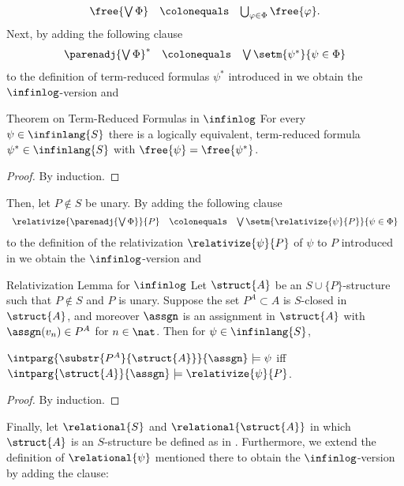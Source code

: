 \begin{enumerate}[1.]
\[
\begin{array}{lll}
\free{\bigvee\Phi} & \colonequals & \bigcup_{\varphi \in \Phi} \free{\varphi}.
\end{array}
\]
Next, by adding the following clause
\[
\begin{array}{lll}
\parenadj{\bigvee \Phi}^\ast & \colonequals & \bigvee \setm{\psi^\ast}{\psi \in \Phi}
\end{array}
\]
to the definition of term-reduced formulas $\psi^\ast$ introduced in  we obtain the $\infinlog$-version and\medskip\\
\begin{theorem}{Theorem on Term-Reduced Formulas in $\infinlog$}
For every $\psi \in \infinlang{S}$ there is a logically equivalent, term-reduced formula $\psi^\ast \in \infinlang{S}$ with $\free{\psi} = \free{\psi^\ast}$.
\end{theorem}
\begin{proof}
By induction.
\end{proof}
Then, let $P \not\in S$ be unary. By adding the following clause
\[
\begin{array}{lll}
\relativize{\parenadj{\bigvee\Phi}}{P} & \colonequals & \bigvee\setm{\relativize{\psi}{P}}{\psi \in \Phi}
\end{array}
\]
to the definition of the relativization $\relativize{\psi}{P}$ of $\psi$ to $P$ introduced in  we obtain the $\infinlog$-version and\medskip\\
\begin{theorem}{Relativization Lemma for $\infinlog$}
Let $\struct{A}$ be an $S \cup \{ P \}$-structure such that $P \not\in S$ and $P$ is unary. Suppose the set $P^A \subset A$ is $S$-closed in $\struct{A}$, and moreover $\assgn$ is an assignment in $\struct{A}$ with $\assgn(v_n) \in P^A$ for $n \in \nat$. Then for $\psi \in \infinlang{S}$,\\
\centerline{$\intparg{\substr{P^A}{\struct{A}}}{\assgn} \models \psi$ \quad iff \quad $\intparg{\struct{A}}{\assgn} \models \relativize{\psi}{P}$.}
\end{theorem}
\begin{proof}
By induction.
\end{proof}
Finally, let $\relational{S}$ and $\relational{\struct{A}}$ in which $\struct{A}$ is an $S$-structure be defined as in . Furthermore, we extend the definition of $\relational{\psi}$ mentioned there to obtain the $\infinlog$-version by adding the clause:
\[
\begin{array}{lll}

\end{array}\]
\end{enumerate}
